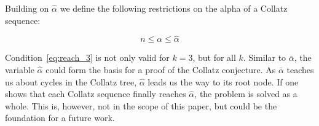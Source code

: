 Building on $\hat\alpha$ we define the following restrictions on the alpha of a Collatz sequence:

\begin{equation}
\label{eq:reach_3}
n\le\alpha\le\hat\alpha
\end{equation}

Condition~\ref{eq:reach_3} is not only valid for $k=3$, but for all $k$. Similar to $\bar\alpha$, the variable $\hat\alpha$ could form the basis for a proof of the Collatz conjecture. As $\bar\alpha$ teaches us about cycles in the Collatz tree, $\hat\alpha$ leads us the way to its root node. If one shows that each Collatz sequence finally reaches $\hat\alpha$, the problem is solved as a whole. This is, however, not in the scope of this paper, but could be the foundation for a future work.
